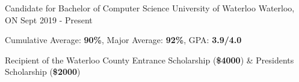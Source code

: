 
\begin{cventries}
  \cventry
    {Candidate for Bachelor of Computer Science} %
    {University of Waterloo} %
    {Waterloo, ON} %
    {Sept 2019 - Present} %
    {
      \begin{cvitems} %
        \item{Cumulative Average: \textbf{90\%}, Major Average: \textbf{92\%}, GPA: \textbf{3.9/4.0}}
        \item {Recipient of the Waterloo County Entrance Scholarship (\textbf{\$4000}) \& President\textquotesingle s Scholarship (\textbf{\$2000})}
      \end{cvitems}
    }
\end{cventries}
